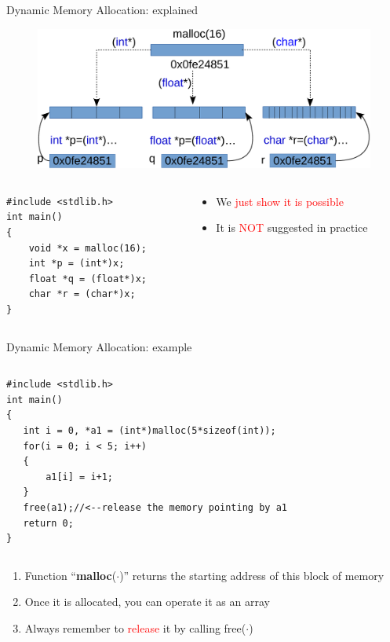 \begin{frame}[fragile]{Dynamic Memory Allocation: explained}
\vspace{-0.1in}
\begin{figure}
\begin{center}
	\includegraphics[width=0.8\linewidth]{figs/malloc.pdf}
\end{center}
\end{figure}
\vspace{-0.1in}
\begin{columns}
\begin{column}{0.45\linewidth}
\begin{lstlisting}
#include <stdlib.h>
int main()
{
    void *x = malloc(16);
    int *p = (int*)x;
    float *q = (float*)x;
    char *r = (char*)x;
}
\end{lstlisting}
\end{column}
\begin{column}{0.5\linewidth}
\begin{itemize}
	\item {We \textcolor{red}{just show it is possible}}
	\item {It is \textcolor{red}{NOT} suggested in practice}
\end{itemize}
\end{column}
\end{columns}
\end{frame}

\begin{frame}[fragile]{Dynamic Memory Allocation: example}
\begin{columns}
\begin{column}{0.85\linewidth}
\begin{lstlisting}
#include <stdlib.h>
int main()
{
   int i = 0, *a1 = (int*)malloc(5*sizeof(int));
   for(i = 0; i < 5; i++)
   {
       a1[i] = i+1;
   }
   free(a1);//<--release the memory pointing by a1
   return 0;
}
\end{lstlisting}
\end{column}
\end{columns}
\vspace{-0.2in}
\begin{enumerate}
	\item {Function ``\textbf{malloc}($\cdot$)'' returns the starting address of this block of memory}
	\item {Once it is allocated, you can operate it as an array}
	\item {Always remember to \textcolor{red}{release} it by calling free($\cdot$)}
\end{enumerate}
\end{frame}

